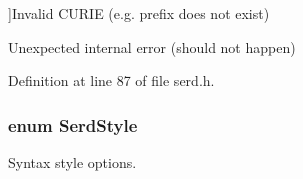 \begin{Desc}
\begin{description}
{}]Invalid C\+U\+R\+IE (e.\+g. prefix does not exist) \item[{\em 
S\+E\+R\+D\+\_\+\+E\+R\+R\+\_\+\+I\+N\+T\+E\+R\+N\+AL\hypertarget{group__serd_gga104d544e48b6282ef2447bb3ac7c330da80c3ada89b84f63901565856dd56389b}{}\label{group__serd_gga104d544e48b6282ef2447bb3ac7c330da80c3ada89b84f63901565856dd56389b}
}]Unexpected internal error (should not happen) \end{description}
\end{Desc}


Definition at line 87 of file serd.\+h.

\subsubsection[{\texorpdfstring{Serd\+Style}{SerdStyle}}]{\setlength{\rightskip}{0pt plus 5cm}enum {\bf Serd\+Style}}\hypertarget{group__serd_gae51da58ac1f1886c75ee2326495daeb2}{}\label{group__serd_gae51da58ac1f1886c75ee2326495daeb2}
Syntax style options.

